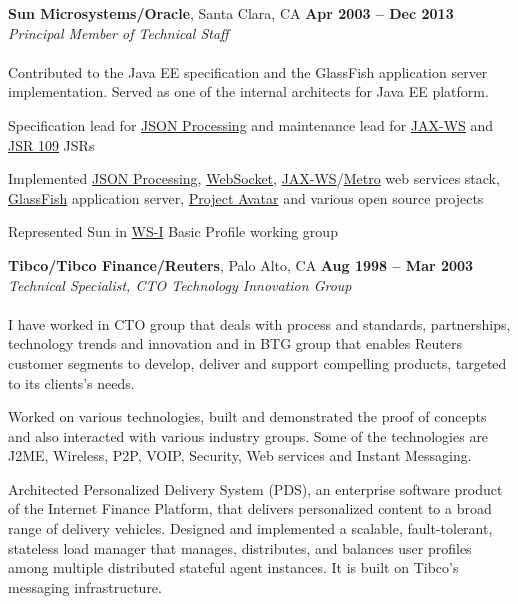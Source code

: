 \documentclass[margin,line]{resume}
\begin{document}
\begin{resume}
    \textbf{Sun Microsystems/Oracle}, Santa Clara, CA \hfill \textbf{Apr 2003 -- Dec 2013}\\ 
    \textsl{Principal Member of Technical Staff}\\\\
Contributed to the Java EE specification and the GlassFish application server implementation. Served as one of the internal architects for Java EE platform.
    \begin{list2}
    \item Specification lead for \href{http://jcp.org/en/jsr/detail?id=353}{JSON Processing} and maintenance lead for \href{http://jcp.org/en/jsr/detail?id=224}{JAX-WS} and \href{http://jcp.org/en/jsr/detail?id=109}{JSR 109} JSRs
    \item Implemented \href{https://jsonp.java.net}{JSON Processing}, \href{https://tyrus.java.net}{WebSocket}, \href{https://jax-ws.java.net}{JAX-WS}/\href{https://metro.java.net}{Metro} web services stack, \href{https://glassfish.java.net}{GlassFish} application server, \href{https://avatar.java.net}{Project Avatar} and various open source projects
    \item Represented Sun in \href{http://www.ws-i.org}{WS-I} Basic Profile working group
    \end{list2}\vspace{-1.5mm}


    \textbf{Tibco/Tibco Finance/Reuters}, Palo Alto, CA  \hfill \textbf{Aug 1998 -- Mar 2003}\\
    \textsl{Technical Specialist, CTO Technology Innovation Group}\\\\
I have worked in CTO group that deals with process and standards, partnerships, technology trends and innovation and in BTG group that enables Reuters customer segments to develop, deliver and support compelling products, targeted to its clients's needs.

    \begin{list2}
    \item Worked on various technologies, built and demonstrated the proof of concepts and also interacted with various industry groups. Some of the technologies are J2ME, Wireless, P2P, VOIP, Security, Web services and Instant Messaging.
    \item Architected Personalized Delivery System (PDS), an enterprise software product of the Internet Finance Platform, that delivers personalized content to a broad range of delivery vehicles. Designed and implemented a scalable, fault-tolerant, stateless load manager that manages, distributes, and balances user profiles among multiple distributed stateful agent instances. It is built on Tibco's messaging infrastructure.
    \end{list2}\vspace{-1.5mm}


\end{resume}
\end{document}
